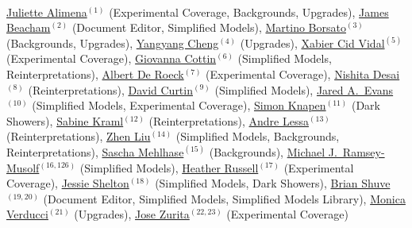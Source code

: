 

\\

\noindent \href{mailto:juliette.alimena@cern.ch}{Juliette Alimena}$^{(1)}$ (Experimental Coverage, Backgrounds, Upgrades), \href{mailto:j.beacham@cern.ch}{James Beacham}$^{(2)}$ (Document Editor, Simplified Models), \href{mailto:martino.borsato@cern.ch}{Martino Borsato}$^{(3)}$ (Backgrounds, Upgrades), \href{mailto:yangyang.cheng@cornell.edu}{Yangyang Cheng}$^{(4)}$ (Upgrades), \href{mailto:xabier.cid.vidal@cern.ch}{Xabier Cid Vidal}$^{(5)}$ (Experimental Coverage), \href{mailto:gcottin@phys.ntu.edu.tw}{Giovanna Cottin}$^{(6)}$ (Simplified Models, Reinterpretations), \href{mailto:deroeck@mail.cern.ch}{Albert De Roeck}$^{(7)}$ (Experimental Coverage), \href{mailto:ddesai@theory.tifr.res.in}{Nishita Desai}$^{(8)}$ (Reinterpretations), \href{mailto:dcurtin@physics.utoronto.ca}{David Curtin}$^{(9)}$ (Simplified Models), \href{mailto:jaredaevans@gmail.com}{Jared A.~Evans}$^{(10)}$ (Simplified Models, Experimental Coverage), \href{mailto:knapen@ias.edu}{Simon Knapen}$^{(11)}$ (Dark Showers), \href{mailto:sabine.kraml@lpsc.in2p3.fr}{Sabine Kraml}$^{(12)}$ (Reinterpretations), \href{mailto:andre.lessa@ufabc.edu.br}{Andre Lessa}$^{(13)}$ (Reinterpretations), \href{mailto:zliuphys@umd.edu}{Zhen Liu}$^{(14)}$ (Simplified Models, Backgrounds, Reinterpretations), \href{mailto:sascha.mehlhase@cern.ch}{Sascha Mehlhase}$^{(15)}$ (Backgrounds), \href{mailto:mjrm@physics.umass.edu}{Michael J.~Ramsey-Musolf}$^{(16,126)}$ (Simplified Models), \href{mailto:hrussell@cern.ch}{Heather Russell}$^{(17)}$ (Experimental Coverage), \href{mailto:sheltonj@illinois.edu}{Jessie Shelton}$^{(18)}$ (Simplified Models, Dark Showers), \href{mailto:bshuve@g.hmc.edu}{Brian Shuve}$^{(19,20)}$ (Document Editor, Simplified Models, Simplified Models Library), \href{mailto:monica.verducci@cern.ch}{Monica Verducci}$^{(21)}$ (Upgrades), \href{mailto:jose.zurita@kit.edu}{Jose Zurita}$^{(22,23)}$ (Experimental Coverage)\\

\vspace{1.5cm}



\\

